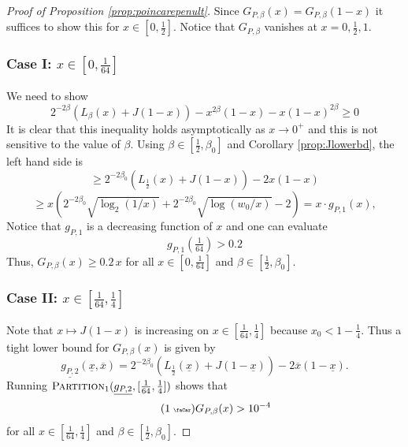 \documentclass[12pt]{amsart}
\theoremstyle{plain}
\newcommand{\auto}{\tag{\addtocounter{equation}{1}\theequation\;{\tiny\faCar}}}
\theoremstyle{definition}
\theoremstyle{remark}
\numberwithin{equation}{section}
\begin{document}
\begin{proof}[Proof of Proposition \ref{prop:poincarepenult}]
Since $G_{P,\beta}(x)=G_{P,\beta}(1-x)$ it suffices to show this for $x\in [0,\tfrac12]$.
Notice that $G_{P,\beta}$ vanishes at $x=0,\tfrac12,1$.

\subsubsection*{Case I: $x\in [0,\tfrac1{64}]$}
We need to show
\[2^{-2\beta}( L_\beta(x) + J(1-x)) - x^{2\beta}(1-x) - x(1-x)^{2\beta} \ge 0\]
It is clear that this inequality holds asymptotically as $x\to 0^+$ and this is not sensitive to the value of $\beta$.
Using $\beta\in[\frac12,\beta_0]$ and Corollary \ref{prop:Jlowerbd}, the left hand side is
\begin{equation*}
\ge 2^{-2\beta_0}(L_{\frac12}(x) + J(1-x)) - 2x(1-x)
\end{equation*}
\[ \ge x (2^{-2\beta_0} \sqrt{\log_2(1/x)} + 2^{-2\beta_0} \sqrt{\log(w_0/x)}- 2) = x\cdot  g_{P,1}(x),  \]
Notice that $g_{P,1}$ is a decreasing function of $x$ and one can evaluate 
\begin{equation}
g_{P,1}(\tfrac1{64})>0.2
\end{equation}
Thus, $G_{P,\beta}(x)\ge 0.2\, x$ for all $x\in [0,\tfrac1{64}]$ and $\beta\in[\frac12,\beta_0]$.

\subsubsection*{Case II: $x\in [\tfrac1{64},\tfrac14]$}
Note that $x\mapsto J(1-x)$ is increasing on $x\in [\frac1{64},\frac14]$ because $x_0<1-\tfrac14$.
Thus a tight lower bound for $G_{P,\beta}(x)$ is given by
\[\underline{g_{P,2}}(\underline{x},\overline{x})= 2^{-2\beta_0}(L_{\frac12}(\underline{x}) + J(1-\underline{x})) - 2\overline{x}(1-\underline{x}).\]
Running $\textsc{Partition}_1(\underline{g_{P,2}},[\tfrac1{64},\tfrac14])$ shows that
\begin{equation}\label{eqn:g_P_2_auto}\auto
G_{P,\beta}(x)>10^{-4}
\end{equation}
for all $x\in [\frac1{64},\frac14]$ and $\beta\in[\frac12,\beta_0]$.


\end{proof}
\end{document}
